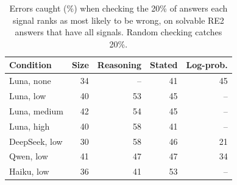 \begin{table}[t]
\centering
\small
\caption{Errors caught (\%) when checking the 20\% of answers each signal ranks as most likely to be wrong, on solvable RE2 answers that have all signals. Random checking catches 20\%.}
\label{tab:triage}
\begin{tabular}{@{}lrrrr@{}}
\toprule
Condition & Size & Reasoning & Stated & Log-prob. \\
\midrule
Luna, none & 34 & -- & 41 & 45 \\
Luna, low & 40 & 53 & 45 & -- \\
Luna, medium & 42 & 54 & 45 & -- \\
Luna, high & 40 & 58 & 41 & -- \\
DeepSeek, low & 30 & 58 & 46 & 21 \\
Qwen, low & 41 & 47 & 47 & 34 \\
Haiku, low & 36 & 41 & 53 & -- \\
\bottomrule
\end{tabular}
\end{table}
